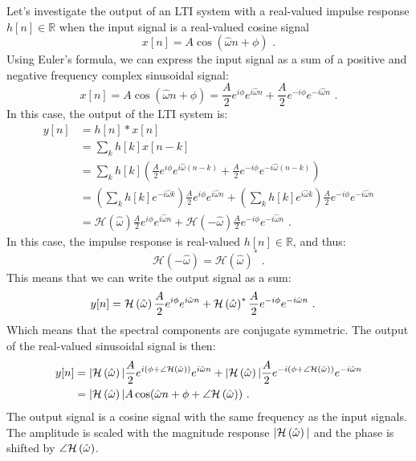     Let's investigate the output of an LTI system with a real-valued
    impulse response $h[n]\in\mathbb{R}$ when the input signal is a real-valued cosine signal
    \begin{equation}
        x[n] = A\cos(\hat{\omega} n + \phi)\,\,.
    \end{equation}
    Using Euler's formula, we can express the input signal as a sum of a
    positive and negative frequency complex sinusoidal signal:
    \begin{equation}
        x[n] = A \cos(\hat{\omega} n + \phi) = \frac{A}{2}e^{i\phi}e^{i\hat{\omega} n} + \frac{A}{2}e^{-i\phi}e^{-i\hat{\omega} n}\,\,.
    \end{equation}
    In this case, the output of the LTI system is:
    \begin{align}
        y[n] & = h[n]*x[n]                                                                                                                                                                           \\
             & = \sum_{k} h[k]x[n-k]                                                                                                                                                                 \\
             & = \sum_{k} h[k] \left( \frac{A}{2}e^{i\phi}e^{i\hat{\omega} (n-k)} + \frac{A}{2}e^{-i\phi}e^{-i\hat{\omega} (n-k)} \right)                                                            \\
             & = \left(\sum_{k} h[k] e^{-i\hat{\omega} k}\right) \frac{A}{2}e^{i\phi}e^{i\hat{\omega} n} + \left(\sum_{k} h[k] e^{i\hat{\omega} k}\right) \frac{A}{2}e^{-i\phi} e^{-i\hat{\omega} n} \\
             & = \mathcal{H}(\hat{\omega}) \frac{A}{2}e^{i\phi}e^{i\hat{\omega} n} + \mathcal{H}(-\hat{\omega}) \frac{A}{2}e^{-i\phi}e^{-i\hat{\omega} n}\,\,.
    \end{align}
    In this case, the impulse response is real-valued $h[n]\in \mathbb{R}$, and thus:
    \begin{equation}
        \mathcal{H}(-\hat{\omega}) = \mathcal{H}(\hat{\omega})^*\,\,.
    \end{equation}
    This means that we can write the output signal as a sum:
    \begin{align}
        y[n] & = \mathcal{H}\left(\hat{\omega}\right) \frac{A}{2}e^{i\phi}e^{i\hat{\omega} n} +  \mathcal{H}\left(\hat{\omega}\right)^*\frac{A}{2}e^{-i\phi} e^{-i\hat{\omega} n}\,\,.
    \end{align}
    Which means that the spectral components are conjugate symmetric. The output of the real-valued sinusoidal signal is then:
    \begin{align}
        y[n] & = |\mathcal{H}\left(\hat{\omega}\right)|\frac{A}{2} e^{i(\phi + \angle \mathcal{H}\left(\hat{\omega}\right))}e^{i\hat{\omega} n} + |\mathcal{H}\left(\hat{\omega}\right)|\frac{A}{2}e^{-i(\phi + \angle \mathcal{H}\left(\hat{\omega}\right))} e^{-i\hat{\omega} n} \\
             & = |\mathcal{H}\left(\hat{\omega}\right)| A \cos(\hat{\omega} n + \phi + \angle \mathcal{H}\left(\hat{\omega}\right))\,\,.
    \end{align}
    The output signal is a cosine signal with the same frequency as the
    input signals. The amplitude is scaled with the magnitude response
    $|\mathcal{H}\left(\hat{\omega}\right)|$ and the phase is shifted by $\angle \mathcal{H}\left(\hat{\omega}\right)$.


